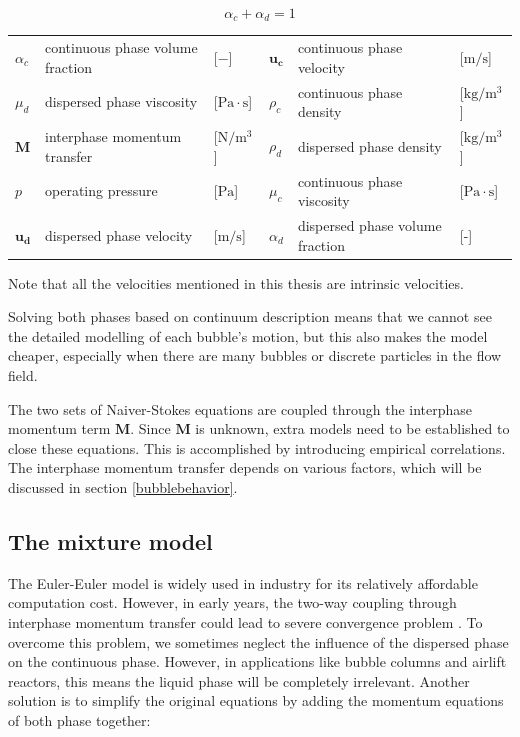 \begin{equation}
    \alpha_c+\alpha_d=1
\end{equation}

\begin{center}
\begin{tabular}{l l l| l l l}

  $\alpha_c$  &  continuous phase volume fraction & [$-$] & $\mathbf{u_c}$ & continuous phase velocity & [$\mathrm{m/s}$]\\
   
  $\mu_d$ & dispersed phase viscosity & [$ \mathrm{Pa \cdot s}$] & $\rho_c$ & continuous phase density & [$\mathrm{kg/m^3}$]\\
   
  $\mathbf{M}$ & interphase momentum transfer & [$\mathrm{N/m^3}$] & $\rho_d$ & dispersed phase density & [$\mathrm{kg/m^3}$]\\
   
  $p$ & operating pressure & [$\mathrm{Pa}$] & $\mu_c$ & continuous phase viscosity & [$\mathrm{Pa \cdot s}$]\\
   
  $\mathbf{u_d}$ & dispersed phase velocity & [$\mathrm{m/s}$] & 
  $\alpha_d$ & dispersed phase volume fraction & [-]
   
\end{tabular}
\end{center}

Note that all the velocities mentioned in this thesis are intrinsic velocities.

Solving both phases based on continuum description \cite{Darmana2005} means that we cannot see the detailed modelling of each bubble's motion, but this also makes the model cheaper, especially when there are many bubbles or discrete particles in the flow field.

 The two sets of Naiver-Stokes equations are coupled through the interphase momentum term $\mathbf{M}$. Since $\mathbf{M}$ is unknown, extra models need to be established to close these equations. This is accomplished by introducing empirical correlations. The interphase momentum transfer depends on various factors, which will be discussed in section \ref{bubblebehavior}.

\subsection{The mixture model}

The Euler-Euler model is widely used in industry for its relatively affordable computation cost. However, in early years, the two-way coupling through interphase momentum transfer could lead to severe convergence problem \cite{Sokolichin2004}. To overcome this problem, we sometimes neglect the influence of the dispersed phase on the continuous phase. However, in applications like bubble columns and airlift reactors, this means the liquid phase will be completely irrelevant. Another solution is to simplify the original equations by adding the momentum equations of both phase together:

